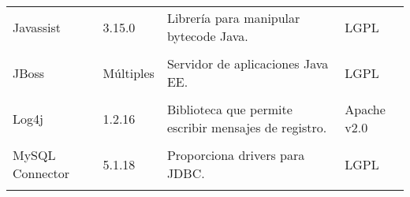 \begin{longtable}[]{@{}llll@{}}
\begin{minipage}[t]{0.18\columnwidth}\raggedright\strut
Javassist \cite{lic:javss} \strut
\end{minipage} & \begin{minipage}[t]{0.08\columnwidth}\raggedright\strut
3.15.0\strut
\end{minipage} & \begin{minipage}[t]{0.49\columnwidth}\raggedright\strut
Librería para manipular bytecode Java.\strut
\end{minipage} & \begin{minipage}[t]{0.11\columnwidth}\raggedright\strut
LGPL\strut
\end{minipage}\tabularnewline\tabularnewline


\begin{minipage}[t]{0.18\columnwidth}\raggedright\strut
JBoss \cite{lic:jboss} \strut
\end{minipage} & \begin{minipage}[t]{0.08\columnwidth}\raggedright\strut
Múltiples\strut
\end{minipage} & \begin{minipage}[t]{0.49\columnwidth}\raggedright\strut
Servidor de aplicaciones Java EE.\strut
\end{minipage} & \begin{minipage}[t]{0.11\columnwidth}\raggedright\strut
LGPL\strut
\end{minipage}\tabularnewline\tabularnewline


\begin{minipage}[t]{0.18\columnwidth}\raggedright\strut
Log4j \cite{lic:log4j} \strut
\end{minipage} & \begin{minipage}[t]{0.08\columnwidth}\raggedright\strut
1.2.16\strut
\end{minipage} & \begin{minipage}[t]{0.49\columnwidth}\raggedright\strut
Biblioteca que permite escribir mensajes de registro.\strut
\end{minipage} & \begin{minipage}[t]{0.11\columnwidth}\raggedright\strut
Apache v2.0\strut
\end{minipage}\tabularnewline\tabularnewline


\begin{minipage}[t]{0.18\columnwidth}\raggedright\strut
MySQL Connector \cite{lic:mysql} \strut
\end{minipage} & \begin{minipage}[t]{0.08\columnwidth}\raggedright\strut
5.1.18\strut
\end{minipage} & \begin{minipage}[t]{0.49\columnwidth}\raggedright\strut
Proporciona drivers para JDBC.\strut
\end{minipage} & \begin{minipage}[t]{0.11\columnwidth}\raggedright\strut
LGPL \strut
\end{minipage}\tabularnewline\tabularnewline



\end{longtable}
